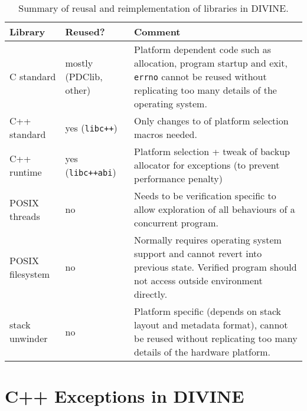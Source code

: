 \begin{table}[tp]
  \begin{tabularx}{\textwidth}{>{\raggedright}p{5.5em}p{5.5em}L}
      \toprule
      Library    & Reused? & Comment \\\midrule\midrule
      C standard & mostly (\mbox{PDClib}, other) & Platform dependent code such as allocation, program startup and exit, \texttt{errno} cannot be reused without replicating too many details of the operating system. \\\midrule
      C++ standard & yes (\texttt{libc++}) & Only changes to of platform selection macros needed. \\\midrule
      C++ runtime  & yes (\texttt{libc++abi}) & Platform selection + tweak of backup allocator for exceptions (to prevent performance penalty) \\\midrule
      POSIX threads & no & Needs to be verification specific to allow exploration of all behaviours of a concurrent program. \\\midrule
      POSIX filesystem & no & Normally requires operating system support and cannot revert into previous state. Verified program should not access outside environment directly. \\\midrule
      stack unwinder & no & Platform specific (depends on stack layout and metadata format), cannot be reused without replicating too many details of the hardware platform. \\
      \bottomrule
  \end{tabularx}
  \caption{Summary of reusal and reimplementation of libraries in DIVINE.}\label{tab:lang:reuse}
\end{table}

\section{C++ Exceptions in DIVINE}\label{sec:lang:except}

